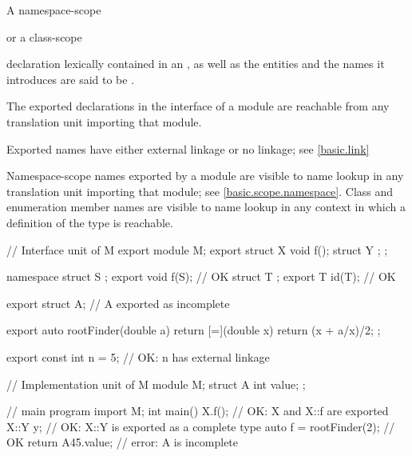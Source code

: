\begin{std.txt}
  \alinea
  A namespace-scope
  \begin{before}\color{addclr}
  or a class-scope
  \end{before}
  declaration lexically
  contained in an , as well as the
  entities and the names it introduces are said to be .
  \begin{before}\color{addclr}
  The exported declarations in the interface of a module are reachable from
  any translation unit importing that module.  
  \end{before}
  \enternote
  Exported names have either external linkage or no linkage; see \ref{basic.link}
  \begin{after}\color{addclr}
  Namespace-scope names exported by a module are visible to name lookup
  in any translation unit importing that module; see \ref{basic.scope.namespace}.
  Class and enumeration member names are visible to name lookup in any
  context in which a definition of the type is reachable.
  \end{after}
  \exitnote
  \begin{example}
    \begin{codeblock}
      // Interface unit of M
      export module M;
      export struct X {
        void f();
        struct Y { };
      };

      namespace {
        struct S { };
      }
      export void f(S);    // OK
      struct T { };
      export T id(T);      // OK
  
      export struct A;     // A exported as incomplete

      export auto rootFinder(double a) {
        return [=](double x) { return (x + a/x)/2; };
      }

      export const int n = 5; // OK: n has external linkage
  
      // Implementation unit of M
      module M;
      struct A {
        int value;
      };
  
      // main program
      import M;
      int main() {
        X{}.f();                // OK: X and X::f are exported
        X::Y y;                 // OK: X::Y is exported as a complete type
        auto f = rootFinder(2); // OK
        return A{45}.value;     // error: A is incomplete
      }
      \end{codeblock}
  \end{example}



\end{std.txt}
